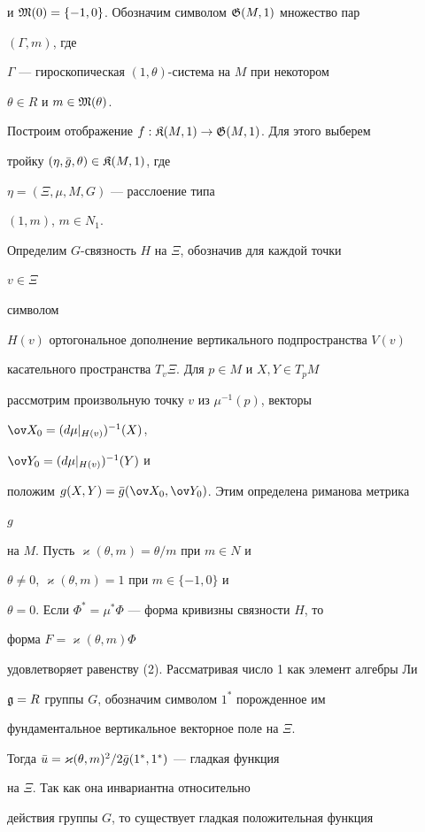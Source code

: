 и $\frak M(0)=\{-1,0\}$. Обозначим символом $\frak G(M,1)$ множество пар 


$(\Gamma,m)$, где 


$\Gamma$ --- гироскопическая $(1,\theta)$-система на $M$ при некотором 


$\theta\in R$ и $m\in\frak M(\theta)$. 


 


Построим отображение $f:\frak K(M,1)\to\frak G(M,1)$. Для этого выберем 


тройку $(\eta,\Bar g,\theta)\in\frak K(M,1)$, где 


$\eta=(\Xi,\mu,M,G)$ --- расслоение типа 


$(1,m)$, $m\in N_1$. 


Определим $G$-связность $H$ на $\Xi$, обозначив для каждой точки 


$v\in\Xi$ 


символом 


$H(v)$ ортогональное дополнение вертикального подпространства $V(v)$ 


касательного пространства $T_v\Xi$. Для $p\in M$ и $X,Y\in T_pM$ 


рассмотрим произвольную точку $v$ из $\mu^{-1}(p)$, векторы 


$\ov X_0=(d\mu|_{H(v)})^{-1}(X)$, 


$\ov Y_0=(d\mu|_{H(v)})^{-1}(Y)$ и 


положим $g(X,Y)=\Bar g(\ov X_0,\ov Y_0)$. Этим определена риманова метрика 


$g$ 


на $M$. Пусть $\varkappa(\theta,m)=\theta/m$ при $m\in N$ и 


$\theta\ne 0$, $\varkappa(\theta,m)=1$ при $m\in\{-1,0\}$ и 


$\theta=0$. Если $\Phi^*=\mu^*\Phi$ --- форма кривизны связности $H$, то 


форма $F=\varkappa(\theta,m)\Phi$ 


удовлетворяет равенству (2). Рассматривая число 1 как элемент алгебры Ли 


$\frak g=R$ группы $G$, обозначим символом $1^*$ порожденное им 


фундаментальное вертикальное векторное поле на $\Xi$. 


Тогда $\Bar u=\varkappa(\theta,m)^2/2\Bar g(1^*,1^*)$ --- гладкая функция 


на $\Xi$. Так как она инвариантна относительно 


действия группы $G$, то существует гладкая положительная функция 


